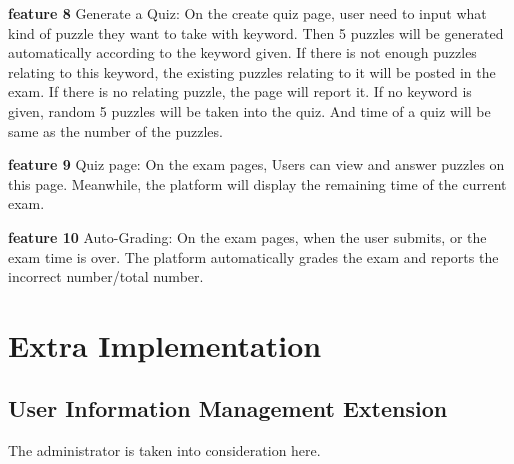 \documentclass{article}
\begin{document}
 \textbf{feature 8} Generate a Quiz: 
On the create quiz page, user need to input what kind of puzzle they want to take with keyword. Then 5 puzzles will be generated automatically according to the keyword given. If there is not enough puzzles relating to this keyword, the existing puzzles relating to it will be posted in the exam. If there is no relating puzzle, the page will report it. If no keyword is given, random 5 puzzles will be taken into the quiz. And time of a quiz will be same as the number of the puzzles.



 \textbf{feature 9} Quiz page: On the exam pages, Users can view and answer puzzles on this page. Meanwhile, the platform will display the remaining time of the current exam.


 \textbf{feature 10} Auto-Grading: On the exam pages, when the user submits, or the exam time is over. The platform automatically grades the exam and reports the incorrect number/total number.



\section{Extra Implementation}

\subsection{User Information Management Extension}
The administrator is taken into consideration here.
\end{document}
